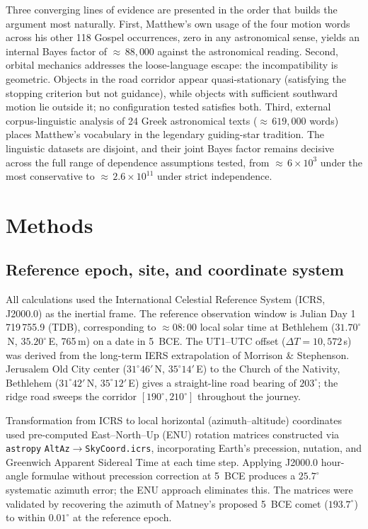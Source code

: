 \documentclass[sn-nature]{sn-jnl}
\begin{document}
Three converging lines of evidence are presented in the order that builds
the argument most naturally.
First, Matthew's own usage of the four motion words across his other 118
Gospel occurrences, zero in any astronomical sense, yields an internal
Bayes factor of ${\approx}\,88{,}000$ against the astronomical reading.
Second, orbital mechanics addresses the loose-language escape: the incompatibility
is geometric. Objects in the road corridor appear quasi-stationary
(satisfying the stopping criterion but not guidance), while objects with
sufficient southward motion lie outside it; no configuration tested satisfies
both.
Third, external corpus-linguistic analysis of 24 Greek astronomical texts
(${\approx}\,619{,}000$ words) places Matthew's vocabulary in the legendary
guiding-star tradition. The linguistic datasets are disjoint, and their
joint Bayes factor remains decisive across the full range of dependence
assumptions tested, from ${\approx}\,6\times10^{3}$ under the most
conservative to ${\approx}\,2.6\times10^{11}$ under strict independence.

\section{Methods}\label{sec:methods}

\subsection{Reference epoch, site, and coordinate system}

All calculations used the International Celestial Reference System (ICRS,
J2000.0) as the inertial frame. The reference observation window is Julian
Day 1\,719\,755.9 (TDB), corresponding to $\approx\!08{:}00$ local solar
time at Bethlehem ($31.70^\circ$\,N, $35.20^\circ$\,E, 765\,m) on a date
in 5~BCE. The UT1--UTC offset ($\Delta T = 10{,}572$\,s) was derived from
the long-term IERS extrapolation of Morrison \& Stephenson\cite{morrison2004}.
Jerusalem Old City center ($31^\circ 46'$\,N, $35^\circ 14'$\,E) to the
Church of the Nativity, Bethlehem ($31^\circ 42'$\,N, $35^\circ 12'$\,E)
gives a straight-line road bearing of $203^\circ$; the ridge road sweeps
the corridor $[190^\circ, 210^\circ]$ throughout the journey.

Transformation from ICRS to local horizontal (azimuth--altitude) coordinates
used pre-computed East--North--Up (ENU) rotation matrices constructed via
\texttt{astropy}\cite{astropy2022} \texttt{AltAz}$\to$\texttt{SkyCoord.icrs},
incorporating Earth's precession, nutation, and Greenwich Apparent Sidereal
Time at each time step. Applying J2000.0 hour-angle formulae without
precession correction at 5~BCE produces a $25.7^\circ$ systematic azimuth
error; the ENU approach eliminates this. The matrices were validated by
recovering the azimuth of Matney's proposed 5~BCE comet\cite{matney2025jbaa}
($193.7^\circ$) to within $0.01^\circ$ at the reference epoch.
\end{document}

